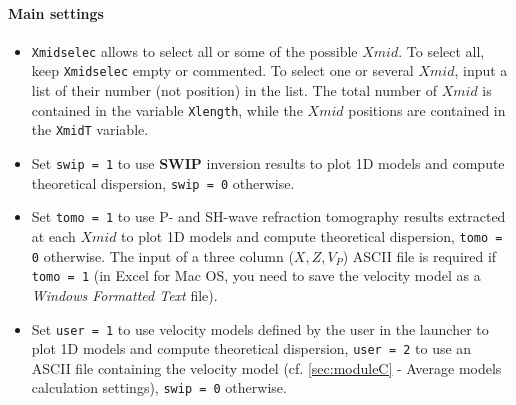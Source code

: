 \documentclass[twoside,a4paper]{article}
\def\SWIP{\textbf{SWIP}}
\begin{document}
\paragraph{Main settings}
\begin{itemize}[leftmargin=*]
\setlength\itemsep{2ex}
\item \verb|Xmidselec| allows to select all or some of the possible $Xmid$. To select all, keep \verb|Xmidselec| empty or commented. To select one or several $Xmid$, input a list of their number (not position) in the list. The total number of $Xmid$ is contained in the variable \verb|Xlength|, while the $Xmid$ positions are contained in the \verb|XmidT| variable.

\item Set \verb|swip = 1| to use {\SWIP} inversion results to plot 1D models and compute theoretical dispersion, \verb|swip = 0| otherwise.

\item Set \verb|tomo = 1| to use P- and SH-wave refraction tomography results extracted at each $Xmid$ to plot 1D models and compute theoretical dispersion, \verb|tomo = 0| otherwise. The input of a three column ($X,Z,V_P$) ASCII file is required if \verb|tomo = 1| (in Excel for Mac OS, you need to save the velocity model as a \textit{Windows Formatted Text} file).

\item Set \verb|user = 1| to use velocity models defined by the user in the launcher to plot 1D models and compute theoretical dispersion, \verb|user = 2| to use an ASCII file containing the velocity model (cf. \ref{sec:moduleC} - Average models calculation settings), \verb|swip = 0| otherwise.
\end{itemize}
\end{document}
